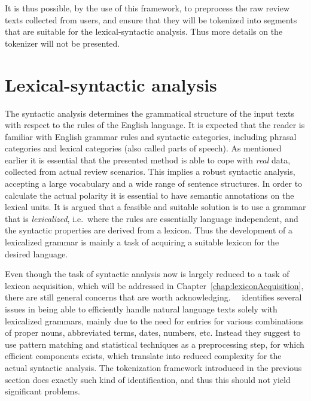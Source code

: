 It is thus possible, by the use of this framework, to preprocess the raw review texts collected from users, and ensure that they will be tokenized into segments that are suitable for the lexical-syntactic analysis. Thus more details on the tokenizer will not be presented.
\vspace{-.5em}

\section{Lexical-syntactic analysis}
\label{sec:syntacticAnalysis}
The syntactic analysis determines the grammatical structure of the input texts with respect to the rules of the English language. It is expected that the reader is familiar with English grammar rules and syntactic categories, including phrasal categories and lexical categories (also called parts of speech). As mentioned earlier it is essential that the presented method is able to cope with \emph{real} data, collected from actual review scenarios. This implies a robust syntactic analysis, accepting a large vocabulary and a wide range of sentence structures. In order to calculate the actual polarity it is essential to have semantic annotations on the lexical units. It is argued that a feasible and suitable solution is to use a grammar that is \emph{lexicalized}, i.e.\ where the rules are essentially language independent, and the syntactic properties are derived from a lexicon. Thus the development of a lexicalized grammar is mainly a task of acquiring a suitable lexicon for the desired language.

Even though the task of syntactic analysis now is largely reduced to a task of lexicon acquisition, which will be addressed in Chapter~\ref{chap:lexiconAcquisition}, there are still general concerns that are worth acknowledging. \citeauthor{extendingCCG}~\ identifies several issues in being able to efficiently handle natural language texts solely with lexicalized grammars, mainly due to the need for entries for various combinations of proper nouns, abbreviated terms, dates, numbers, etc. Instead they suggest to use pattern matching and statistical techniques as a preprocessing step, for which efficient components exists, which translate into reduced complexity for the actual syntactic analysis. The tokenization framework \cite{freeLing} introduced in the previous section does exactly such kind of identification, and thus this should not yield significant problems. 


